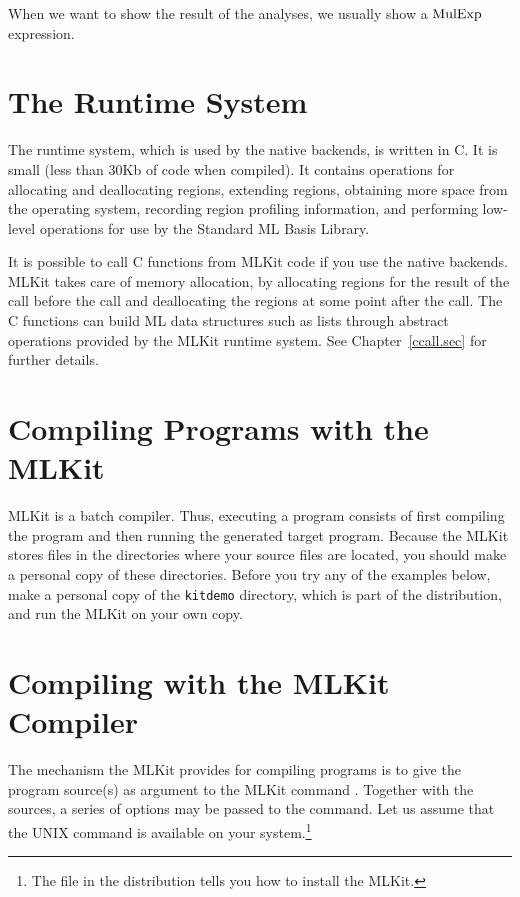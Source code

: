 \documentclass[12pt]{book}
\begin{document}
When we want to show the result of the analyses, we usually show a $\hbox{\rm MulExp}$
expression.

\section{The Runtime System}
The
%
%
runtime system, which is used by the native backends, is written in C. It is
small (less than 30Kb of code when compiled).  It contains operations for
allocating and deallocating regions, extending regions, obtaining more space
from the operating system, recording region profiling information, and
performing low-level operations for use by the Standard ML Basis Library.

It is possible to call
%
%
C functions from MLKit code if you use the native backends.  MLKit takes care of
memory allocation, by allocating regions for the result of the call before the
call and deallocating the regions at some point after the call.  The C functions
can build ML data structures such as lists through abstract operations provided
by the MLKit runtime system. See Chapter~\ref{ccall.sec} for further details.

\section{Compiling Programs with the MLKit}
\label{tryit.sec}

MLKit is a
%
%
batch compiler. Thus, executing a program consists of first compiling the
program and then running the generated target program. Because the MLKit stores
files in the directories where your source files are located, you should make a
personal copy of these directories.  Before you try any of the examples below,
make a personal copy of the \lstinline{kitdemo} directory, which is part of the
distribution, and run the MLKit on your own copy.

\section{Compiling with the MLKit Compiler}

The mechanism the MLKit provides for compiling programs is to give the program
source(s) as argument to the MLKit command
%
%
.  Together with the sources, a series of options may be passed to
the  command. Let us assume that the UNIX command 
is available on your system.\footnote{The  file in the
distribution tells you how to install the MLKit.}
\end{document}
